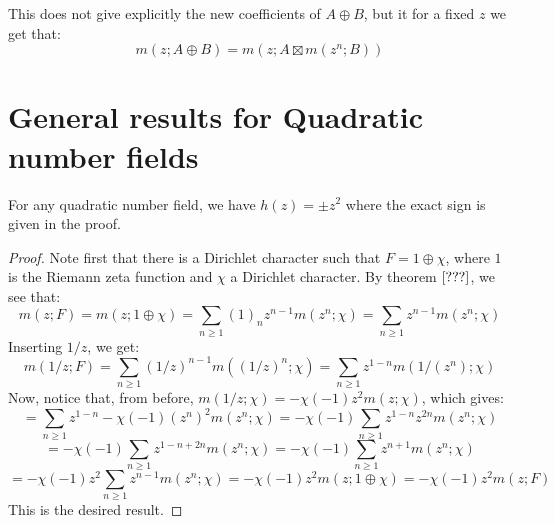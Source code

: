 \documentclass[a4paper]{amsart}
\begin{document}
\begin{note}
  This does not give explicitly the new coefficients of $A \oplus B$, but it for a fixed $z$ we get that: 
  $$m(z; A \oplus B) = m(z; A \boxtimes m(z^n; B))$$
  
\end{note}

\section{General results for Quadratic number fields}

\begin{theorem}
  For any quadratic number field, we have $h(z) = \pm z^2$ where the exact sign is given in the proof.
\end{theorem}

\begin{proof}
  Note first that there is a Dirichlet character such that $F = 1 \oplus \chi$, where $1$ is the Riemann zeta function and $\chi$ a Dirichlet character. By theorem $\ref{???}$, we see that:
  $$m(z; F) = m(z; 1 \oplus \chi) = \sum_{n \ge 1} (1)_n z^{n - 1} m(z^n; \chi) = \sum_{n \ge 1} z^{n - 1} m(z^n; \chi)$$
  Inserting $1/z$, we get:
  $$m(1/z; F) = \sum_{n \ge 1} (1/z)^{n - 1} m((1/z)^n; \chi) = \sum_{n \ge 1} z^{1 - n} m(1/(z^n); \chi) $$
  Now, notice that, from before, $m(1/z; \chi) = -\chi(-1)z^2m(z; \chi)$, which gives:
  $$ = \sum_{n \ge 1} z^{1 - n} -\chi(-1)(z^n)^2m(z^n; \chi) = -\chi(-1)\sum_{n \ge 1} z^{1 - n} z^{2n} m(z^n; \chi)$$
  $$ = -\chi(-1)\sum_{n \ge 1} z^{1 - n + 2n} m(z^n; \chi) = -\chi(-1)\sum_{n \ge 1} z^{n + 1} m(z^n; \chi)$$
  $$ = -\chi(-1) z^2 \sum_{n \ge 1}  z^{n - 1} m(z^n; \chi) = -\chi(-1) z^2 m(z;1 \oplus \chi) = -\chi(-1) z^2 m(z;F)$$
  This is the desired result. 
\end{proof}
\end{document}
